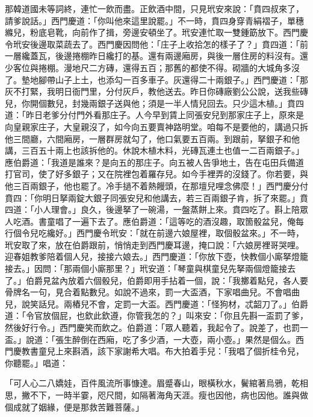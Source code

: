 那韓道國未等詞終，連忙一飲而盡。正飲酒中間，只見玳安來說：「賁四叔來了，請爹說話。」西門慶道：「你叫他來這里說罷。」不一時，賁四身穿青絹褶子，單穗縧兒，粉底皂靴，向前作了揖，旁邊安頓坐了。玳安連忙取一雙鍾筯放下。西門慶令玳安後邊取菜蔬去了。西門慶因問他：「庄子上收拾怎的樣子了？」賁四道：「前一層纔蓋瓦，後邊捲棚昨日纔打的基。還有兩邊廂房，與後一層住房的料沒有。還少客位與捲棚。漫地尺二方磚，還得五百；那舊的都使不得。砌牆的大城角多沒了。墊地腳帶山子上土，也添勾一百多車子。灰還得二十兩銀子。」西門慶道：「那灰不打緊，我明日衙門里，分付灰戶，教他送去。昨日你磚廠劉公公說，送我些磚兒，你開個數兒，封幾兩銀子送與他；須是一半人情兒回去。只少這木植。」賁四道：「昨日老爹分付門外看那庄子。人今早到賃上同張安兒到那家庄子上，原來是向皇親家庄子，大皇親沒了，如今向五要賣神路明堂。咱每不是要他的，講過只拆他三間廳，六間廂房，一層群房就勾了，他口氣要五百兩。到跟前，拏銀子和他講，三百五十兩上也該拆他的。休說木植木料，光磚瓦連土也值一二百兩銀子。」應伯爵道：「我道是誰來？是向五的那庄子。向五被人告爭地土，告在屯田兵備道打官司，使了好多銀子；又在院裡包着羅存兒。如今手裡弄的沒錢了。你若要，與他三百兩銀子，他也罷了。冷手撾不着熱饅頭，在那壇兒哩念佛麼！」西門慶分付賁四：「你明日拏兩錠大銀子同張安兒和他講去，若三百兩銀子肯，拆了來罷。」賁四道：「小人理會。」良久，後邊拏了一碗湯，一盤蒸餅上來。賁四吃了。斟上陪眾人吃酒。書童唱了一遍下去了。應伯爵道：「這等吃的酒沒趣，取箇骰盆兒，俺每行個令兒吃纔好。」西門慶令玳安：「就在前邊六娘屋裡，取個骰盆來。」不一時，玳安取了來，放在伯爵跟前，悄悄走到西門慶耳邊，掩口說：「六娘房裡哥哭哩。迎春姐教爹陪着個人兒，接接六娘去。」西門慶道：「你放下壺，快教個小廝拏燈籠接去。」因問：「那兩個小廝那里？」玳安道：「琴童與棋童兒先拏兩個燈籠接去了。」伯爵見盆內放着六個骰兒，伯爵即用手拈着一個，說：「我擲着點兒，各人要骨牌名一句，見合着點數兒。如說不過來，罰一大盃酒，下家唱曲兒。不會唱曲兒，說笑話兒。兩樁兒不會，定罰一大盃。西門慶道：「怪狗材，忒韶刀了。」伯爵道：「令官放個屁，也欽此欽遵，你管我怎的？」叫來安：「你且先斟一盃罰了爹，然後好行令。」西門慶笑而飲之。伯爵道：「眾人聽着，我起令了。說差了，也罰一盃。」說道：「張生醉倒在西廂，吃了多少酒，一大壺，兩小壺。」果然是個么。西門慶教書童兒上來斟酒，該下家謝希大唱。布大拍着手兒：「我唱了個折桂令兒，你聽罷。」唱道：

「可人心二八嬌娃，百件風流所事慷達。眉蹙春山，眼橫秋水，鬢綰著烏鴉，乾相思，撇不下，一時半霎，咫尺間，如隔著海角天涯。瘦也因他，病也因他。誰與做個成就了姻緣，便是那救苦難菩薩。」

